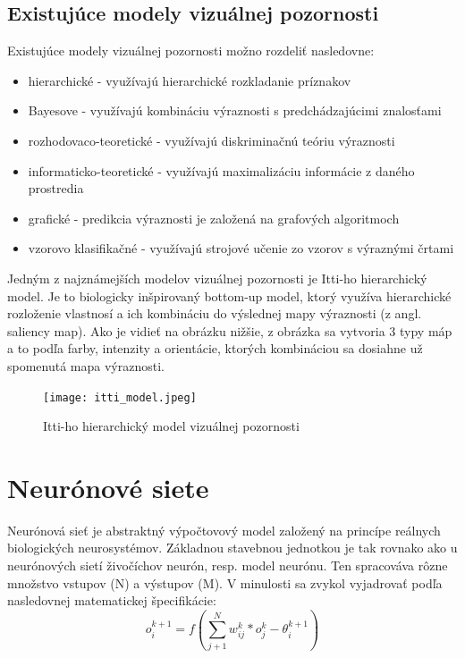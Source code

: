 \subsection{Existujúce modely vizuálnej pozornosti}
\label{itti}
Existujúce modely vizuálnej pozornosti\cite{polatsek} možno rozdeliť nasledovne:
\begin{itemize}
	\item hierarchické - využívajú hierarchické rozkladanie príznakov
	\item Bayesove - využívajú kombináciu výraznosti s predchádzajúcimi znalosťami
	\item rozhodovaco-teoretické - využívajú diskriminačnú teóriu výraznosti
	\item informaticko-teoretické - využívajú maximalizáciu informácie z daného prostredia
	\item grafické - predikcia výraznosti je založená na grafových algoritmoch
	\item vzorovo klasifikačné - využívajú strojové učenie zo vzorov s výraznými črtami
\end{itemize}

Jedným z najznámejších modelov vizuálnej pozornosti je Itti-ho hierarchický model\cite{itti}. Je to biologicky inšpirovaný bottom-up model, ktorý využíva hierarchické rozloženie vlastnosí a ich kombináciu do výslednej mapy výraznosti (z angl. saliency map). Ako je vidieť na obrázku nižšie, z obrázka sa vytvoria 3 typy máp a to podľa farby, intenzity a orientácie, ktorých kombináciou sa dosiahne už spomenutá mapa výraznosti. 

\begin{figure}[H]
	\begin{center}
		\texttt{[image: itti\_model.jpeg]}
	\end{center}
	\caption[Itti-ho hierarchický model vizuálnej pozornosti]{Itti-ho hierarchický model vizuálnej pozornosti\cite{itti}}
\end{figure}

\section{Neurónové siete}
\label{nn}
	 Neurónová sieť je abstraktný výpočtovový model založený na princípe reálnych biologických neurosystémov. Základnou stavebnou jednotkou je tak rovnako ako u neurónových sietí živočíchov neurón, resp. model neurónu\cite{neuron}. Ten spracováva rôzne množstvo vstupov (N) a výstupov (M). V minulosti sa zvykol vyjadrovať podľa nasledovnej matematickej špecifikácie: 
	\begin{equation}
		o_i ^{k+1} = f\left ( \sum_{j+1}^{N} w_{ij}^{k} * o_j^k - \theta_i^{k+1}  \right )
	\end{equation}
	
